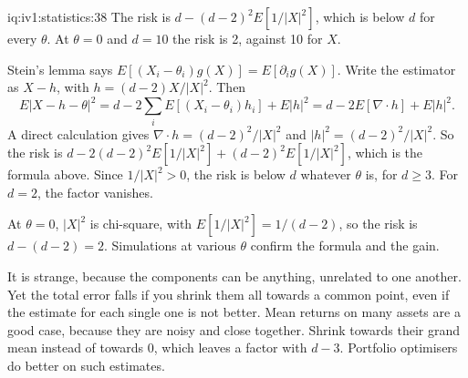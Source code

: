 \begin{solution}{iq:iv1:statistics:38}
The risk is $d - (d - 2)^2 E[1/|X|^2]$, which is below $d$ for every $\theta$. At $\theta = 0$ and $d = 10$ the risk is 2, against 10 for $X$.

Stein's lemma says $E[(X_i - \theta_i)g(X)] = E[\partial_i g(X)]$. Write the estimator as $X - h$, with $h = (d - 2)X/|X|^2$. Then
\[
E|X - h - \theta|^2 = d - 2\sum_i E[(X_i - \theta_i)h_i] + E|h|^2 = d - 2E[\nabla \cdot h] + E|h|^2.
\]
A direct calculation gives $\nabla \cdot h = (d - 2)^2/|X|^2$ and $|h|^2 = (d - 2)^2/|X|^2$. So the risk is $d - 2(d - 2)^2 E[1/|X|^2] + (d - 2)^2 E[1/|X|^2]$, which is the formula above. Since $1/|X|^2 > 0$, the risk is below $d$ whatever $\theta$ is, for $d \ge 3$. For $d = 2$, the factor vanishes.

At $\theta = 0$, $|X|^2$ is chi-square, with $E[1/|X|^2] = 1/(d - 2)$, so the risk is $d - (d - 2) = 2$. Simulations at various $\theta$ confirm the formula and the gain.

It is strange, because the components can be anything, unrelated to one another. Yet the total error falls if you shrink them all towards a common point, even if the estimate for each single one is not better. Mean returns on many assets are a good case, because they are noisy and close together. Shrink towards their grand mean instead of towards 0, which leaves a factor with $d - 3$. Portfolio optimisers do better on such estimates.

\end{solution}

